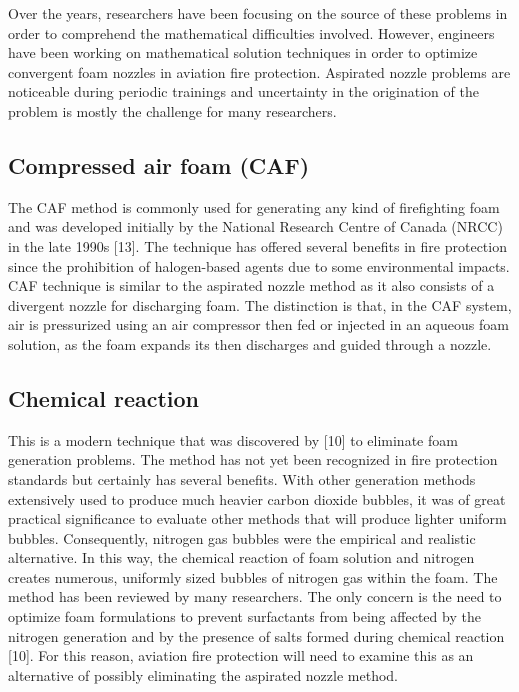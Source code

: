 \documentclass[12pt]{report}
\begin{document}
Over the years, researchers have been focusing on the source of these problems in order to comprehend the mathematical difficulties involved. However, engineers have been working on mathematical solution techniques in order to optimize convergent foam nozzles in aviation fire protection. Aspirated nozzle problems are noticeable during periodic trainings and uncertainty in the origination of the problem is mostly the challenge for many researchers.

\subsection{Compressed air foam (CAF)}
The CAF method is commonly used for generating any kind of firefighting foam and was developed initially by the National Research Centre of Canada (NRCC) in the late 1990s [13]. The technique has offered several benefits in fire protection since the prohibition of halogen-based agents due to some environmental impacts.  
CAF technique is similar to the aspirated nozzle method as it also consists of a divergent nozzle for discharging foam. The distinction is that, in the CAF system, air is pressurized using an air compressor then fed or injected in an aqueous foam solution, as the foam expands its then discharges and guided through a nozzle.

\subsection{Chemical reaction}
This is a modern technique that was discovered by [10] to eliminate foam generation problems. The method has not yet been recognized in fire protection standards but certainly has several benefits. With other generation methods extensively used to produce much heavier carbon dioxide bubbles, it was of great practical significance to evaluate other methods that will produce lighter uniform bubbles. Consequently, nitrogen gas bubbles were the empirical and realistic alternative. In this way, the chemical reaction of foam solution and nitrogen creates numerous, uniformly sized bubbles of nitrogen gas within the foam.
The method has been reviewed by many researchers.  The only concern is the need to optimize foam formulations to prevent surfactants from being affected by the nitrogen generation and by the presence of salts formed during chemical reaction [10].  For this reason, aviation fire protection will need to examine this as an alternative of possibly eliminating the aspirated nozzle method.
\end{document}
